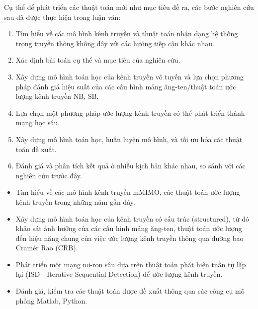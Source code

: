Cụ thể để phát triển các thuật toán mới như mục tiêu đề ra, các bước nghiên cứu sau đã được thực hiện trong luận văn:

\begin{enumerate}
    \item Tìm hiểu về các mô hình kênh truyền và thuật toán nhận dạng hệ thống trong truyền thông không dây với các hướng tiếp cận khác nhau. 
	\item Xác định bài toán cụ thể và mục tiêu của nghiên cứu.
    \item Xây dựng mô hình toán học của kênh truyền vô tuyến và lựa chọn phương pháp đánh giá hiệu suất của các cấu hình mảng ăng-ten/thuật toán ước lượng kênh truyền NB, SB.
    \item Lựa chọn một phương pháp ước lượng kênh truyền có thể phát triển thành mạng học sâu.
	\item Xây dựng mô hình toán học, huấn luyện mô hình, và tối ưu hóa các thuật toán đề xuất.
	\item Đánh giá và phân tích kết quả ở nhiều kịch bản khác nhau, so sánh với các nghiên cứu trước đây.
\end{enumerate} 
\vspace{0.3cm}


\renewcommand{\labelitemi}{$-$}
\begin{itemize}
	\item Tìm hiểu về các mô hình kênh truyền mMIMO, các thuật toán ước lượng kênh truyền trong những năm gần đây.
    \item Xây dựng mô hình toán học của kênh truyền có cấu trúc (structured), từ đó khảo sát ảnh hưởng của các cấu hình mảng ăng-ten, thuật toán ước lượng đến hiệu năng chung của việc ước lượng kênh truyền thông qua đường bao Cramér Rao (CRB).
    
	\item Phát triển một mạng nơ-ron sâu dựa trên thuật toán phát hiện tuần tự lặp lại (ISD - Iterative Sequential Detection) để ước lượng kênh truyền.
	
 \item Đánh giá, kiểm tra các thuật toán được đề xuất thông qua các công cụ mô phỏng Matlab, Python.
\end{itemize} 
\vspace{0.3cm}

